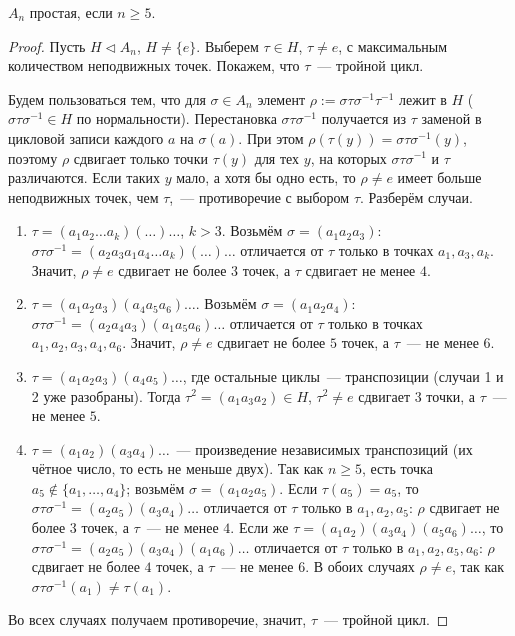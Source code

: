 \documentclass[12pt]{article}
\begin{document}
	\begin{theorem}[Галуа]\label{thm:an-simple}
		$A_n$ простая, если $n \geqslant 5$.
	\end{theorem}
	\begin{proof}
		Пусть $H \vartriangleleft A_n$, $H \ne \{ e \}$. Выберем $\tau \in H$, $\tau \ne e$, с максимальным количеством неподвижных точек. Покажем, что $\tau$~--- тройной цикл.

		Будем пользоваться тем, что для $\sigma \in A_n$ элемент $\rho := \sigma\tau\sigma^{-1}\tau^{-1}$ лежит в $H$ ($\sigma\tau\sigma^{-1} \in H$ по нормальности). Перестановка $\sigma\tau\sigma^{-1}$ получается из $\tau$ заменой в цикловой записи каждого $a$ на $\sigma(a)$. При этом $\rho(\tau(y)) = \sigma\tau\sigma^{-1}(y)$, поэтому $\rho$ сдвигает только точки $\tau(y)$ для тех $y$, на которых $\sigma\tau\sigma^{-1}$ и $\tau$ различаются. Если таких $y$ мало, а хотя бы одно есть, то $\rho \ne e$ имеет больше неподвижных точек, чем $\tau$,~--- противоречие с выбором $\tau$. Разберём случаи.
		\begin{enumerate}
			\item $\tau = (a_1 a_2 \ldots a_k)(\ldots)\ldots$, $k > 3$. Возьмём $\sigma = (a_1 a_2 a_3)$: $\sigma\tau\sigma^{-1} = (a_2 a_3 a_1 a_4 \ldots a_k)(\ldots)\ldots$ отличается от $\tau$ только в точках $a_1, a_3, a_k$. Значит, $\rho \ne e$ сдвигает не более $3$ точек, а $\tau$ сдвигает не менее $4$.
			\item $\tau = (a_1 a_2 a_3)(a_4 a_5 a_6)\ldots$. Возьмём $\sigma = (a_1 a_2 a_4)$: $\sigma\tau\sigma^{-1} = (a_2 a_4 a_3)(a_1 a_5 a_6)\ldots$ отличается от $\tau$ только в точках $a_1, a_2, a_3, a_4, a_6$. Значит, $\rho \ne e$ сдвигает не более $5$ точек, а $\tau$~--- не менее $6$.
			\item $\tau = (a_1 a_2 a_3)(a_4 a_5)\ldots$, где остальные циклы~--- транспозиции (случаи 1 и 2 уже разобраны). Тогда $\tau^2 = (a_1 a_3 a_2) \in H$, $\tau^2 \ne e$ сдвигает $3$ точки, а $\tau$~--- не менее $5$.
			\item $\tau = (a_1 a_2)(a_3 a_4)\ldots$~--- произведение независимых транспозиций (их чётное число, то есть не меньше двух). Так как $n \geqslant 5$, есть точка $a_5 \notin \{a_1, \ldots, a_4\}$; возьмём $\sigma = (a_1 a_2 a_5)$. Если $\tau(a_5) = a_5$, то $\sigma\tau\sigma^{-1} = (a_2 a_5)(a_3 a_4)\ldots$ отличается от $\tau$ только в $a_1, a_2, a_5$: $\rho$ сдвигает не более $3$ точек, а $\tau$~--- не менее $4$. Если же $\tau = (a_1 a_2)(a_3 a_4)(a_5 a_6)\ldots$, то $\sigma\tau\sigma^{-1} = (a_2 a_5)(a_3 a_4)(a_1 a_6)\ldots$ отличается от $\tau$ только в $a_1, a_2, a_5, a_6$: $\rho$ сдвигает не более $4$ точек, а $\tau$~--- не менее $6$. В обоих случаях $\rho \ne e$, так как $\sigma\tau\sigma^{-1}(a_1) \ne \tau(a_1)$.
		\end{enumerate}
		Во всех случаях получаем противоречие, значит, $\tau$~--- тройной цикл.


\end{proof}
\end{document}
